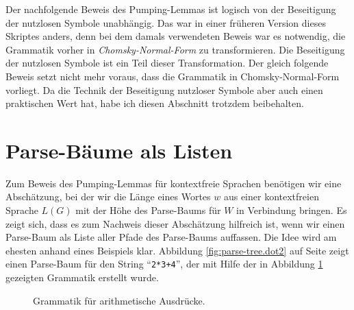 \remark
Der nachfolgende Beweis des Pumping-Lemmas ist logisch von der Beseitigung der nutzlosen
Symbole unabh\"angig.  Das war in einer fr\"uheren Version dieses Skriptes anders, denn bei
dem damals verwendeten Beweis war es notwendig, die Grammatik vorher in
\emph{Chomsky-Normal-Form} zu transformieren.  Die Beseitigung der nutzlosen
Symbole ist ein Teil dieser Transformation.  Der gleich folgende Beweis setzt nicht mehr
voraus, dass die Grammatik in Chomsky-Normal-Form vorliegt.  Da die Technik der
Beseitigung nutzloser Symbole aber auch einen praktischen Wert hat, habe ich diesen
Abschnitt trotzdem beibehalten. 

\section{Parse-B\"aume als Listen}
Zum Beweis des Pumping-Lemmas f\"ur kontextfreie Sprachen ben\"otigen wir eine
Absch\"atzung, bei der wir die L\"ange eines Wortes $w$ aus einer kontextfreien Sprache $L(G)$ 
mit der H\"ohe des Parse-Baums f\"ur $W$ in Verbindung bringen.  Es zeigt sich, dass es zum Nachweis dieser
Absch\"atzung hilfreich ist, wenn wir einen Parse-Baum als Liste aller Pfade des Parse-Baums auffassen.
Die Idee wird am ehesten anhand eines Beispiels klar.  Abbildung
\ref{fig:parse-tree.dot2} auf Seite \pageref{fig:parse-tree.dot2}
zeigt einen Parse-Baum f\"ur den String ``\texttt{2*3+4}'', der mit Hilfe der in Abbildung
\ref{fig:ArithExpr} gezeigten Grammatik erstellt wurde. 

\begin{figure}[htbp]
  \begin{center}    
  \end{center}
  \caption{Grammatik f\"ur arithmetische Ausdr\"ucke.}
  \label{fig:ArithExpr}
\end{figure}
\vspace*{0.3cm}


